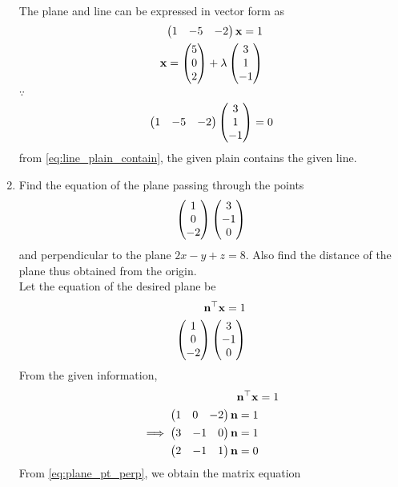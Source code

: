 \documentclass[journal,12pt,twocolumn]{IEEEtran}
\renewcommand\thesection{\arabic{section}}
\begin{document}
\begin{enumerate}[label=\thesection.\arabic*.,ref=\thesection.\theenumi]
	\\
	\solution The plane and line can be expressed in vector form as
  \begin{align}
	  \label{eq:line_plane_contain_plane}
	  \begin{pmatrix}1 & -5 & -2\end{pmatrix}\mathbf{x}=1 
	  \\
	  \mathbf{x} = \begin{pmatrix}5 \\ 0 \\ 2\end{pmatrix} + \lambda \begin{pmatrix}3 \\ 1 \\ -1\end{pmatrix}
	  \label{eq:line_plane_containline}
  \end{align}
  $\because$
  \begin{align}
	  \begin{pmatrix}1 & -5 & -2\end{pmatrix}\begin{pmatrix}3 \\ 1 \\ -1\end{pmatrix} = 0
	  \label{eq:line_plane_containline_sol}
  \end{align}
from 			\eqref{eq:line_plain_contain}, the given plain contains the given line.
\item Find the equation of the plane passing through the points 
\begin{align}
	\begin{pmatrix}1 \\0 \\-2\end{pmatrix} \begin{pmatrix}3 \\ -1 \\0\end{pmatrix}
  \end{align}
	 and perpendicular to the plane $ 2x-y+z=8 $. Also find the distance of the plane thus obtained from the origin.  
\\
\solution Let the equation of the desired plane be 
\begin{align}
	\mathbf{n}^{\top}\mathbf{x} = 1
	\\
	\begin{pmatrix}1 \\0 \\-2\end{pmatrix} \begin{pmatrix}3 \\ -1 \\0\end{pmatrix}
  \end{align}
  From the given information, 
\begin{align}
	\mathbf{n}^{\top}\mathbf{x} &= 1
	\\
\implies
\begin{split}
	\begin{pmatrix}1 &0 &-2\end{pmatrix} \mathbf{n} &=1 
	\\
	\begin{pmatrix}3 & -1 &0\end{pmatrix}\mathbf{n} &=1
	\\
	\begin{pmatrix}2 & -1 & 1\end{pmatrix}\mathbf{n} &=0
	\end{split}
	\label{eq:plane_pt_perp}
  \end{align}
From 
	\eqref{eq:plane_pt_perp},
	we obtain  the matrix equation
\begin{align}

\end{align}
\end{enumerate}
\end{document}
